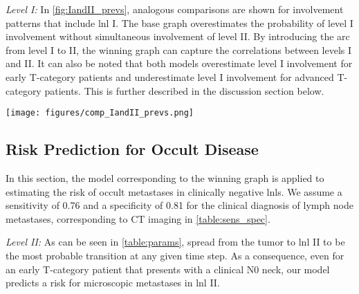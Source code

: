 \documentclass[twocolumn]{aastex631}
\begin{document}
{\it Level I:} In \autoref{fig:IandII_prevs}, analogous comparisons are shown for involvement patterns that include \gls{lnl} I. The base graph overestimates the probability of level I involvement without simultaneous involvement of level II. By introducing the arc from level I to II, the winning graph can capture the correlations between levels I and II. It can also be noted that both models overestimate level I involvement for early T-category patients and underestimate level I involvement for advanced T-category patients. This is further described in the discussion section below.

\begin{figure*}
    \begin{centering}
        \texttt{[image: figures/comp\_IandII\_prevs.png]}
        \caption{Comparison of observed and predicted prevalences of \gls{lnl} I and II involvement patterns. The top and bottom panels show the prevalences for early and advanced T-category, respectively. The solid lines are Beta posteriors from the data, while the histograms are predicted prevalences (colored: winning graph, gray-hatched: base graph). Blue and red plots indicate overall \gls{lnl} I and II involvement, respectively. Green plots indicate \gls{lnl} I involvement without level II, while orange plots indicate the opposite (\gls{lnl} II without level I). The winning graph has an added edge from \gls{lnl} I to II, which improves the prediction of the rare green pattern. \label{fig:IandII_prevs}}
    \end{centering}
\end{figure*}

\subsection{Risk Prediction for Occult Disease}
\label{subsec:results:risk_prediction}

In this section, the model corresponding to the winning graph is applied to estimating the risk of occult metastases in clinically negative \glspl{lnl}. We assume a sensitivity of 0.76 and a specificity of 0.81 for the clinical diagnosis of lymph node metastases, corresponding to CT imaging in \autoref{table:sens_spec}.

{\it Level II:} As can be seen in \autoref{table:params}, spread from the tumor to \gls{lnl} II to be the most probable transition at any given time step. As a consequence, even for an early T-category patient that presents with a clinical N0 neck, our model predicts a  risk for microscopic metastases in \gls{lnl} II.
\end{document}

